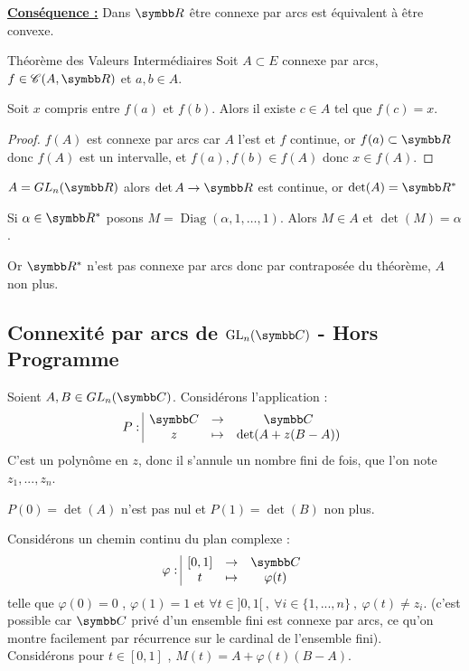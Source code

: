 \textbf{\uline{Conséquence :}} Dans $\R$ être connexe par arcs est équivalent à être convexe.

\begin{theoreme}{Théorème des Valeurs Intermédiaires}{}
    Soit $A \subset E$ connexe par arcs, $f \in \mathscr C(A, \R)$ et $a, b \in A$.

    Soit $x$ compris entre $f(a)$ et $f(b)$. Alors il existe $c \in A$ tel que $f(c) = x$.  
\end{theoreme}


\begin{proof}
    $f(A)$ est connexe par arcs car $A$ l'est et $f$ continue, or $f(a) \subset \R$ donc 
    $f(A)$ est un intervalle, et $f(a), f(b) \in f(A)$ donc $x \in f(A)$. 
\end{proof}

\begin{exemple}
    $A = GL_n(\R)$ alors $\det A \to \R$ est continue, or $\det(A) = \R^*$

    Si $\alpha \in \R^*$ posons $M = \operatorname{Diag}(\alpha, 1, \ldots, 1)$. 
    Alors $M \in A$ et $\det(M) = \alpha$.

    Or $\R^*$ n'est pas connexe par arcs donc par contraposée du théorème, $A$ non plus. 
\end{exemple}

\subsection{Connexité par arcs de $\text{GL}_n(\C)$ - Hors Programme}

Soient $A,B \in GL_n(\C)$.
Considérons l'application :
\[\fonction P {\C} {\C} z {\det(A+z(B-A))}\]
C'est un polynôme en $z$, donc il s'annule un nombre fini de fois, que l'on note $z_1,...,z_n$.

$P(0)=\det(A)$ n'est pas nul et $P(1)=\det(B)$ non plus.

Considérons un chemin continu du plan complexe :
\[\fonction {\varphi} {[0,1]} {\C} t {\varphi(t)}\]
telle que $\varphi(0)=0$ , $\varphi(1)=1$ et $\forall t \in ]0,1[ \ , \ \forall i \in \{1,...,n\}\ , \ \varphi(t) \neq z_i$.
(c'est possible car $\C$ privé d'un ensemble fini est connexe par arcs, ce qu'on montre facilement par récurrence sur le cardinal de l'ensemble fini).\\

Considérons pour $t\in [0,1]$ , $M(t)=A+\varphi(t) (B-A)$.

